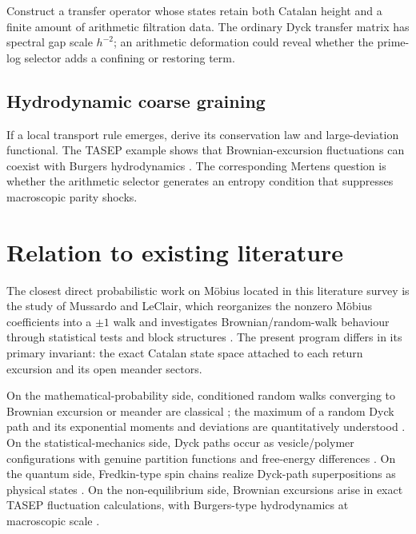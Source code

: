 \documentclass[11pt]{amsart}
\numberwithin{equation}{section}
\theoremstyle{plain}
\theoremstyle{definition}
\theoremstyle{remark}
\begin{document}
Construct a transfer operator whose states retain both Catalan height and a finite amount of arithmetic filtration data.  The ordinary Dyck transfer matrix has spectral gap scale $h^{-2}$; an arithmetic deformation could reveal whether the prime-log selector adds a confining or restoring term.

\subsection{Hydrodynamic coarse graining}
\label{subsec:program_hydrodynamic}

If a local transport rule emerges, derive its conservation law and large-deviation functional.  The TASEP example shows that Brownian-excursion fluctuations can coexist with Burgers hydrodynamics \cite{DerridaEnaudLebowitz2004}.  The corresponding Mertens question is whether the arithmetic selector generates an entropy condition that suppresses macroscopic parity shocks.

\section{Relation to existing literature}
\label{sec:literature_position}

The closest direct probabilistic work on M\"obius located in this literature survey is the study of Mussardo and LeClair, which reorganizes the nonzero M\"obius coefficients into a $\pm1$ walk and investigates Brownian/random-walk behaviour through statistical tests and block structures \cite{MussardoLeClair2021}.  The present program differs in its primary invariant: the exact Catalan state space attached to each return excursion and its open meander sectors.

On the mathematical-probability side, conditioned random walks converging to Brownian excursion or meander are classical \cite{Kaigh1976,DurrettIglehartMiller1977,CsakiMohanty1981}; the maximum of a random Dyck path and its exponential moments and deviations are quantitatively understood \cite{KhorunzhiyMarckert2009,Kousha2012}.  On the statistical-mechanics side, Dyck paths occur as vesicle/polymer configurations with genuine partition functions and free-energy differences \cite{OwczarekPrellberg2014,HaugPrellberg2015}.  On the quantum side, Fredkin-type spin chains realize Dyck-path superpositions as physical states \cite{DellAnnaEtAl2016,SalbergerKorepin2017}.  On the non-equilibrium side, Brownian excursions arise in exact TASEP fluctuation calculations, with Burgers-type hydrodynamics at macroscopic scale \cite{DerridaEnaudLebowitz2004}.
\end{document}
